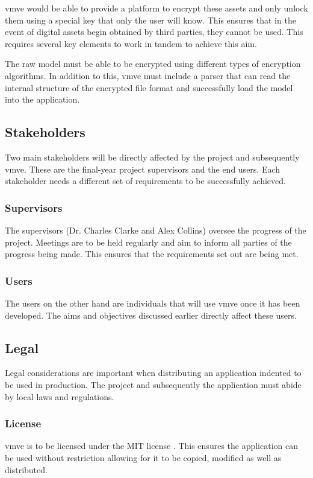 \documentclass[11pt]{article}
\begin{document}
\gls*{vmve} would be able to provide a platform to encrypt these assets and only
unlock them using a special key that only the user will know. This ensures that
in the event of digital assets begin obtained by third parties, they cannot be
used. This requires several key elements to work in tandem to achieve this aim.

The raw model must be able to be encrypted using different types of encryption
algorithms. In addition to this, \gls*{vmve} must include a parser that can read
the internal structure of the encrypted file format and successfully load the
model into the application.

\subsection{Stakeholders}
Two main stakeholders will be directly affected by the project and subsequently
\gls*{vmve}. These are the final-year project supervisors and the end users. Each
stakeholder needs a different set of requirements to be successfully achieved.

\subsubsection{Supervisors}
The supervisors (Dr. Charles Clarke and Alex Collins) oversee the progress of
the project. Meetings are to be held regularly and aim to inform all parties of
the progress being made. This ensures that the requirements set out are being
met.

\subsubsection{Users}
The users on the other hand are individuals that will use \gls*{vmve} once it has
been developed. The aims and objectives discussed earlier directly affect these
users.

\subsection{Legal}
Legal considerations are important when distributing an application indented to
be used in production. The project and subsequently the application must abide by
local laws and regulations.

\subsubsection{License}
\gls*{vmve} is to be licensed under the MIT license \cite{mit}. This ensures the
application can be used without restriction allowing for it to be copied,
modified as well as distributed.
\end{document}
